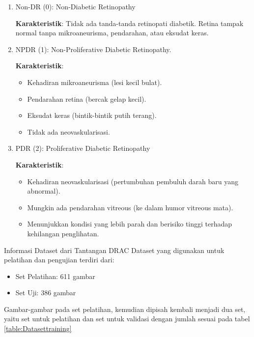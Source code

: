 	\begin{enumerate}
		\item Non-DR (0): Non-Diabetic Retinopathy

		\textbf{Karakteristik}: Tidak ada tanda-tanda retinopati diabetik. Retina tampak normal tanpa mikroaneurisma, pendarahan, atau eksudat keras.
		\item NPDR (1): Non-Proliferative Diabetic Retinopathy.

		\textbf{Karakteristik}:
		\begin{itemize}
			\item Kehadiran mikroaneurisma (lesi kecil bulat).\
			\item Pendarahan retina (bercak gelap kecil).
			\item Eksudat keras (bintik-bintik putih terang).
			\item Tidak ada neovaskularisasi.
		\end{itemize}
		\item PDR (2): Proliferative Diabetic Retinopathy

		\textbf{Karakteristik}:
		\begin{itemize}
			\item Kehadiran neovaskularisasi (pertumbuhan pembuluh darah baru yang abnormal).
			\item Mungkin ada pendarahan vitreous (ke dalam humor vitreous mata).
			\item Menunjukkan kondisi yang lebih parah dan berisiko tinggi terhadap kehilangan penglihatan.
		\end{itemize}
	\end{enumerate}

Informasi Dataset dari Tantangan DRAC
Dataset yang digunakan untuk pelatihan dan pengujian terdiri dari:

	\begin{itemize}
		\item Set Pelatihan: 611 gambar
		\item Set Uji: 386 gambar
	\end{itemize}
Gambar-gambar pada set pelatihan, kemudian dipisah kembali menjadi dua set, yaitu set untuk pelatihan dan set untuk validasi dengan jumlah sesuai pada tabel \ref{table:Datasettraining}

